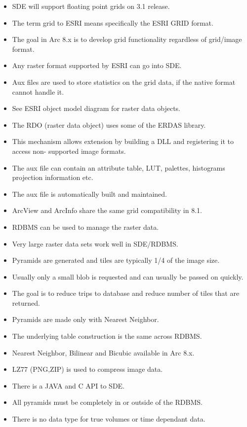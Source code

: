 \begin{itemize}
\item SDE will support floating point grids on 3.1 release.
\item The term grid to ESRI means specifically the ESRI GRID format.
\item The goal in Arc 8.x is to develop grid functionality regardless of grid/image format.
\item Any raster format supported by ESRI can go into SDE.
\item Aux files are used to store statistics on the grid data, if the native format cannot handle it.
\item See ESRI object model diagram for raster data objects.
\item The RDO (raster data object) uses some of the ERDAS library.
\item This mechanism allows extension by building a DLL and registering it to access non-
supported image formats.
\item The aux file can contain an attribute table, LUT, palettes, histograms projection 
information etc.
\item The aux file is automatically built and maintained.
\item ArcView and ArcInfo share the same grid compatibility in 8.1.
\item RDBMS can be used to manage the raster data.
\item Very large raster data sets work well in SDE/RDBMS.
\item Pyramids are generated and tiles are typically 1/4 of the image size.
\item Usually only a small blob is requested and can usually be passed on quickly.
\item The goal is to reduce trips to database and reduce number of tiles that are returned.
\item Pyramids are made only with Nearest Neighbor.
\item The underlying table construction is the same across RDBMS.
\item Nearest Neighbor, Bilinear and Bicubic available in Arc 8.x.
\item LZ77 (PNG,ZIP) is used to compress image data.
\item There is a JAVA and C API to SDE.
\item All pyramids must be completely in or outside of the RDBMS.
\item There is no data type for true volumes or time dependant data.

\end{itemize}
